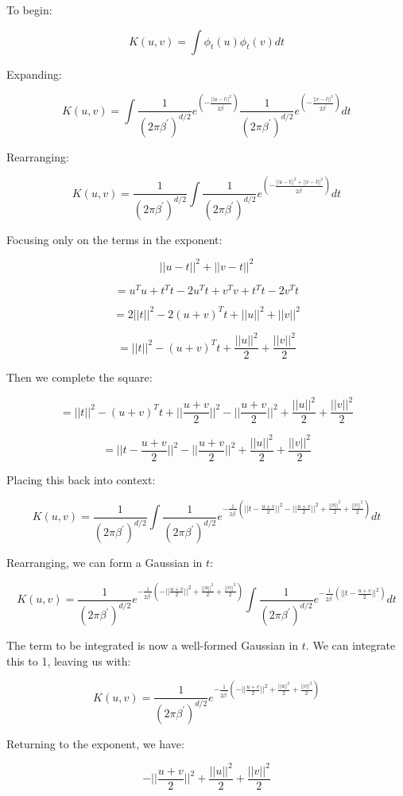\documentclass[11pt]{article}
\begin{document}
To begin:

\[
K(u, v) = \int \phi_t(u) \phi_t(v) dt
\]

Expanding:

\[
K(u, v) = \int \frac{1}{(2\pi\beta^\prime)^{d/2}}e^{({- \frac{||u - t||^2}{2\beta^\prime}})} \frac{1}{(2\pi\beta^\prime)^{d/2}}e^{({- \frac{||v - t||^2}{2\beta^\prime}})} dt
\]

Rearranging:

\[
K(u, v) = \frac{1}{(2\pi\beta^\prime)^{d/2}} \int \frac{1}{(2\pi\beta^\prime)^{d/2}}e^{({- \frac{||u - t||^2 + ||v - t||^2}{2\beta^\prime}})} dt
\]

Focusing only on the terms in the exponent:

\[
||u - t||^2 + ||v - t||^2
\]

\[
= u^Tu + t^Tt - 2u^Tt + v^Tv + t^Tt - 2v^Tt
\]

\[
= 2||t||^2 - 2(u + v)^Tt + ||u||^2 + ||v||^2
\]

\[
= ||t||^2 - (u + v)^Tt + \frac{||u||^2}{2} + \frac{||v||^2}{2}
\]

Then we complete the square:

\[
= ||t||^2 - (u + v)^Tt + ||\frac{u+v}{2}||^2 -  ||\frac{u+v}{2}||^2 + \frac{||u||^2}{2} + \frac{||v||^2}{2}
\]

\[
= ||t - \frac{u + v}{2}||^2 - ||\frac{u+v}{2}||^2 + \frac{||u||^2}{2} + \frac{||v||^2}{2}
\]

Placing this back into context:

\[
K(u, v) = \frac{1}{(2\pi\beta^\prime)^{d/2}} \int \frac{1}{(2\pi\beta^\prime)^{d/2}}e^{-\frac{1}{2\beta^\prime}(||t - \frac{u + v}{2}||^2 - ||\frac{u+v}{2}||^2 + \frac{||u||^2}{2} + \frac{||v||^2}{2})} dt
\]

Rearranging, we can form a Gaussian in $t$:

\[
K(u, v) = \frac{1}{(2\pi\beta^\prime)^{d/2}}e^{-\frac{1}{2\beta^\prime}(- ||\frac{u+v}{2}||^2 + \frac{||u||^2}{2} + \frac{||v||^2}{2})} \int \frac{1}{(2\pi\beta^\prime)^{d/2}}e^{-\frac{1}{2\beta^\prime}(||t - \frac{u + v}{2}||^2)} dt
\]

The term to be integrated is now a well-formed Gaussian in $t$. We can integrate this to 1, leaving us with:

\[
K(u, v) = \frac{1}{(2\pi\beta^\prime)^{d/2}}e^{-\frac{1}{2\beta^\prime}(- ||\frac{u+v}{2}||^2 + \frac{||u||^2}{2} + \frac{||v||^2}{2})}
\]

Returning to the exponent, we have:

\[
- ||\frac{u+v}{2}||^2 + \frac{||u||^2}{2} + \frac{||v||^2}{2}
\]
\end{document}
